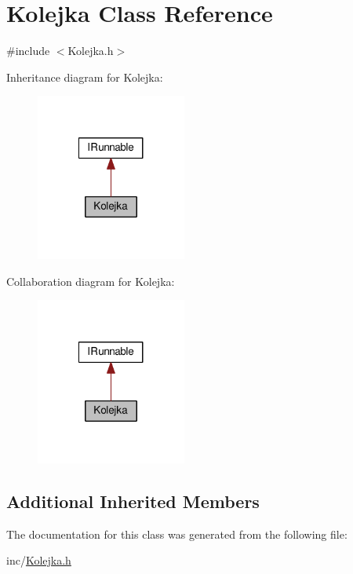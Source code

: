 \hypertarget{class_kolejka}{\section{Kolejka Class Reference}
\label{class_kolejka}
}


{\ttfamily \#include $<$Kolejka.\-h$>$}



Inheritance diagram for Kolejka\-:
\nopagebreak
\begin{figure}[H]
\begin{center}
\leavevmode
\includegraphics[width=140pt]{class_kolejka__inherit__graph}
\end{center}
\end{figure}


Collaboration diagram for Kolejka\-:
\nopagebreak
\begin{figure}[H]
\begin{center}
\leavevmode
\includegraphics[width=140pt]{class_kolejka__coll__graph}
\end{center}
\end{figure}
\subsection*{Additional Inherited Members}


The documentation for this class was generated from the following file\-:\begin{DoxyCompactItemize}
\item 
inc/\hyperlink{_kolejka_8h}{Kolejka.\-h}\end{DoxyCompactItemize}
